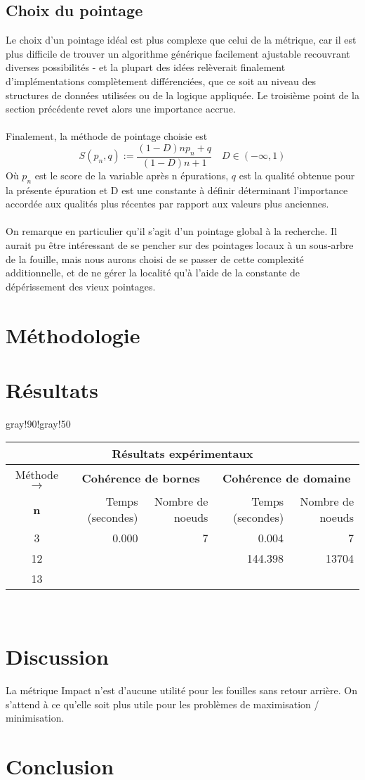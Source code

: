 \documentclass{article}
\begin{document}
\subsection{Choix du pointage}
Le choix d'un pointage idéal est plus complexe que celui de la métrique,
car il est plus difficile de trouver un algorithme générique facilement
ajustable recouvrant diverses possibilités - et la plupart des idées 
relèverait finalement d'implémentations complètement différenciées, que
ce soit au niveau des structures de données utilisées ou de la logique 
appliquée. Le troisième point de la section précédente revet alors une
importance accrue. \\
\\
Finalement, la méthode de pointage choisie est
\[ S(p_n, q) := \frac{(1 - D)np_n + q}{(1 - D)n + 1} \quad D \in (-\infty, 1) \]
Où $p_n$ est le score de la variable après n épurations, $q$ est la 
qualité obtenue pour la présente épuration et D est une constante à définir
déterminant l'importance accordée aux qualités plus récentes par rapport aux
valeurs plus anciennes. \\
\\
On remarque en particulier qu'il s'agit d'un pointage global à la recherche.
Il aurait pu être intéressant de se pencher sur des pointages locaux à un
sous-arbre de la fouille, mais nous aurons choisi de se passer de cette
complexité additionnelle, et de ne gérer la localité qu'à l'aide de la
constante de dépérissement des vieux pointages.

\section{Méthodologie}

\section{Résultats}
{
\centering
{}
{gray!90!gray!50}
\begin{tabular}{|c||r|r||r|r|  }
	\hline
	\multicolumn{5}{|c|}{\bf{Résultats expérimentaux}} \\
	\hline
	Méthode $\rightarrow$
	& \multicolumn{2}{c||}{\bf{Cohérence de bornes}} 
	& \multicolumn{2}{c|}{\bf{Cohérence de domaine}} \\
	\hline
	\bf{n} & Temps (secondes) & Nombre de noeuds & Temps (secondes) & Nombre de noeuds \\
	\hline
	3	& 0.000		& 7			& 0.004		& 7 \\
	12	& 	& 					& 144.398	& 13704 \\
	13	& 	& 					& 	&  \\
	\hline
\end{tabular} \\
}

\section{Discussion}

La métrique Impact n'est d'aucune utilité pour les fouilles sans retour arrière.
On s'attend à ce qu'elle soit plus utile pour les problèmes de
maximisation / minimisation.

\section{Conclusion}
\end{document}
